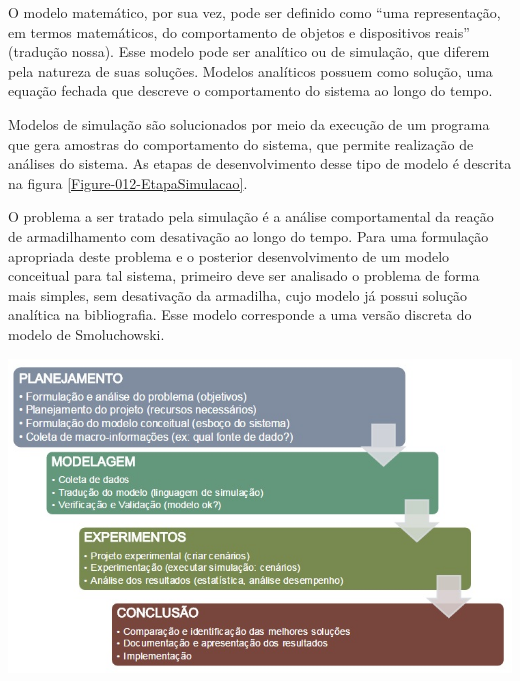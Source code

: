 O modelo matemático, por sua vez, pode ser definido como ``uma
representação, em termos matemáticos, do comportamento de objetos e dispositivos
reais''\cite{2} (tradução nossa). Esse modelo pode ser analítico ou de
simulação, que diferem pela natureza de suas soluções. Modelos analíticos
possuem como solução, uma equação fechada que descreve o comportamento do
sistema ao longo do tempo\cite{1}.

Modelos de simulação são solucionados por meio da execução de um programa que
gera amostras do comportamento do sistema, que permite realização de análises
do sistema\cite{1}. As etapas de desenvolvimento desse tipo de modelo é
descrita na figura \ref{Figure-012-EtapaSimulacao}.

O problema a ser tratado pela simulação é a análise comportamental da reação de
armadilhamento com desativação ao longo do tempo. Para uma formulação apropriada
deste problema e o posterior desenvolvimento de um modelo conceitual para tal
sistema, primeiro deve ser analisado o problema de forma mais simples, sem
desativação da armadilha, cujo modelo já possui solução analítica na
bibliografia. Esse modelo corresponde a uma versão discreta do modelo de
Smoluchowski\cite{5}.

{ \centering
	\hfill \break
	\captionsetup{type=figure}
	\includegraphics[width=\columnwidth]{./figures/012-EtapaSimulacao.jpg}
	\label{Figure-012-EtapaSimulacao}
}
